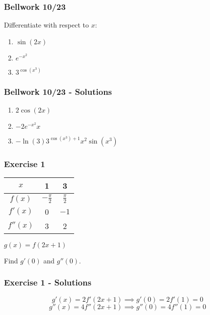 \documentclass[12pt]{beamer}
\begin{document}
\begin{frame}
	\frametitle{Bellwork 10/23}
	\initclock

	\Large
	Differentiate with respect to $x$:\par
	\vfill
	\begin{enumerate}\itemsep2ex
		\item $\sin(2x)$
		\item $e^{-x^2}$
		\item $3^{\cos(x^3)}$
	\end{enumerate}
	\vfill
	\vfill
	\vfill
	
	\small
	\crono
\end{frame}
\begin{frame}
	\frametitle{Bellwork 10/23 - Solutions}

	\LARGE
	\begin{enumerate}\itemsep2ex
		\item $2\cos(2x)$
		\item $-2e^{-x^2}x$
		\item $-\ln(3)3^{\cos(x^3)+1}x^2\sin(x^3)$
	\end{enumerate}
\end{frame}
\begin{frame}
	\frametitle{Exercise 1}

	\vfill
	\vfill
	\begin{table}[]
		\begin{tabular}{|c||c|c|}\hline
			$x$      & 1            & 3           \\ \hline
			$f(x)$   & $-\frac\pi2$ & $\frac\pi2$ \\ \hline
			$f'(x)$  & 0            & $-1$        \\ \hline
			$f''(x)$ & 3            & 2           \\ \hline
		\end{tabular}\par
		\vfill
		$g(x)=f(2x+1)$\par
		\vfill
		\Large
		Find $g'(0)$ and $g''(0)$.
	\end{table}
	\vfill
\end{frame}
\begin{frame}
	\frametitle{Exercise 1 - Solutions}

	\large
	\[g'(x)=2f'(2x+1)\implies \boxed{g'(0)=2f'(1)=0}\]
	\[g''(x)=4f''(2x+1)\implies \boxed{g''(0)=4f''(1)=0}\]
\end{frame}
\end{document}
